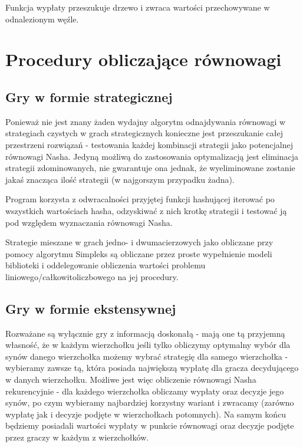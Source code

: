 \documentclass{standalone}
\begin{document}
Funkcja wypłaty przeszukuje drzewo i zwraca wartości przechowywane w odnalezionym węźle.

\section{Procedury obliczające równowagi}

\subsection{Gry w formie strategicznej}

Ponieważ nie jest znany żaden wydajny algorytm odnajdywania równowagi w strategiach czystych w grach strategicznych konieczne
jest przeszukanie całej przestrzeni rozwiązań - testowania każdej kombinacji strategii jako potencjalnej równowagi Nasha.
Jedyną możliwą do zastosowania optymalizacją jest eliminacja strategii zdominowanych, nie gwarantuje ona jednak, że wyeliminowane
zostanie jakaś znacząca ilość strategii (w najgorszym przypadku żadna).

Program korzysta z odwracalności przyjętej funkcji hashującej iterować po wszystkich wartościach hasha, odzyskiwać z nich krotkę
strategii i testować ją pod względem wyznaczania równowagi Nasha.

Strategie mieszane w grach jedno- i dwumacierzowych jako obliczane przy pomocy algorytmu Simpleks są obliczane przez proste wypełnienie
modeli biblioteki  i oddelegowanie obliczenia wartości problemu liniowego/całkowitoliczbowego na jej procedury.

\subsection{Gry w formie ekstensywnej}

Rozważane są wyłącznie gry z informacją doskonałą - mają one tą przyjemną własność, że w każdym wierzchołku jeśli
tylko obliczymy optymalny wybór dla synów danego wierzchołka możemy wybrać strategię dla samego wierzchołka - wybieramy
zawsze tą, która posiada największą wypłatę dla gracza decydującego w danych wierzchołku. Możliwe jest więc obliczenie
równowagi Nasha rekurencyjnie - dla każdego wierzchołka obliczamy wypłaty oraz decyzje jego synów, po czym wybieramy najbardziej
korzystny wariant i zwracamy (zarówno wypłatę jak i decyzje podjęte w wierzchołkach potomnych). Na samym końcu będziemy posiadali
wartości wypłaty w punkcie równowagi oraz decyzje podjęte przez graczy w każdym z wierzchołków.
\end{document}
